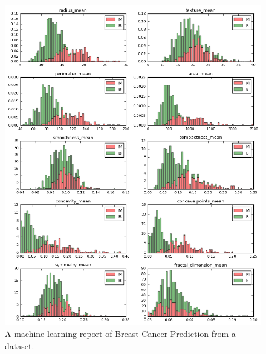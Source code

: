 \begin{figure}
\centering
\includegraphics[scale = 0.55]{cancer}
\caption{A machine learning report of Breast Cancer Prediction from a dataset.\cite{kagglecancer}}
\end{figure}
